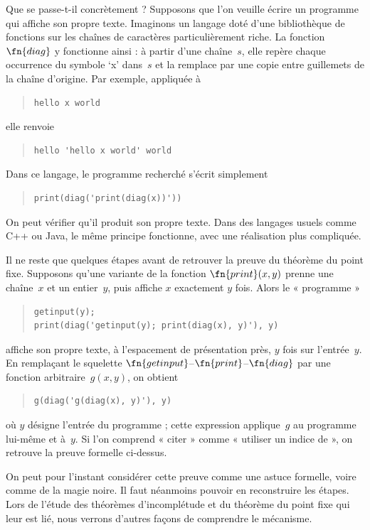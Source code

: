 \documentclass[../../../include/open-logic-section]{subfiles}
\begin{document}
\begin{explain}
Que se passe-t-il concrètement ? Supposons
que l'on veuille écrire un programme qui
affiche son propre texte. Imaginons un langage
doté d'une bibliothèque de fonctions sur les
chaînes de caractères particulièrement riche.
La fonction $\fn{diag}$ y fonctionne ainsi :
à partir d'une chaîne~$s$, elle repère chaque
occurrence du symbole `x' dans~$s$ et la
remplace par une copie entre guillemets de
la chaîne d'origine. Par exemple, appliquée à
\begin{quote}
\begin{verbatim}
hello x world
\end{verbatim}
\end{quote}
elle renvoie
\begin{quote}
\begin{verbatim}
hello 'hello x world' world
\end{verbatim}
\end{quote}
Dans ce langage, le programme recherché
s'écrit simplement
\begin{quote}
\begin{verbatim}
print(diag('print(diag(x))'))
\end{verbatim}
\end{quote}
On peut vérifier qu'il produit son propre
texte. Dans des langages usuels comme C++ ou
Java, le même principe fonctionne, avec une
réalisation plus compliquée.

Il ne reste que quelques étapes avant de
retrouver la preuve du théorème du point fixe.
Supposons qu'une variante de la fonction
$\fn{print}(x,y)$ prenne une chaîne~$x$ et
un entier~$y$, puis affiche $x$ exactement
$y$ fois. Alors le « programme »
\begin{quote}
\begin{verbatim}
getinput(y);
print(diag('getinput(y); print(diag(x), y)'), y)
\end{verbatim}
\end{quote}
affiche son propre texte, à l'espacement de présentation près, $y$ fois sur
l'entrée~$y$. En remplaçant le squelette
$\fn{getinput}$--$\fn{print}$--$\fn{diag}$
par une fonction arbitraire~$g(x,y)$, on obtient
\begin{quote}
\begin{verbatim}
g(diag('g(diag(x), y)'), y)
\end{verbatim}
\end{quote}
où $y$ désigne l'entrée du programme ; cette expression applique~$g$ au
programme lui-même et à~$y$. Si l'on comprend
« citer » comme « utiliser un indice de »,
on retrouve la preuve formelle ci-dessus.

On peut pour l'instant considérer cette preuve
comme une astuce formelle, voire comme de la
magie noire. Il faut néanmoins pouvoir en
reconstruire les étapes. Lors de l'étude des
théorèmes d'incomplétude et du théorème du
point fixe qui leur est lié, nous verrons
d'autres façons de comprendre le mécanisme.
\end{explain}
\end{document}
